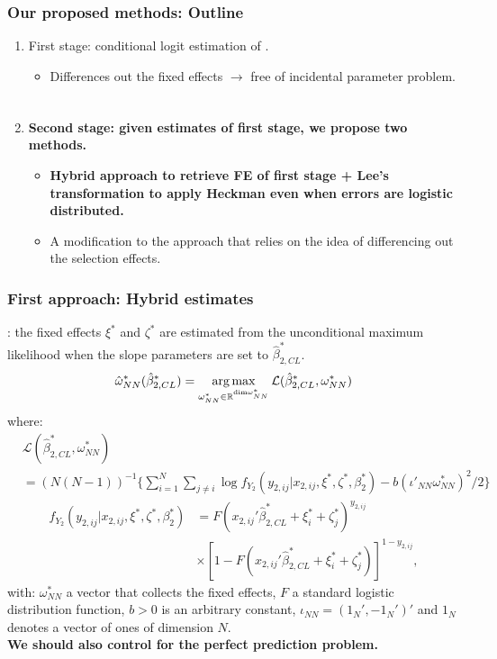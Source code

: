 \begin{frame}
    \frametitle{Our proposed methods: Outline}
    \begin{enumerate}
        \item First stage: conditional logit estimation of \cite{charbonneau2017multiple}.
        \begin{itemize}
            \item Differences out the fixed effects $\xrightarrow[]{}$ free of incidental parameter problem.\\~\\ 
        \end{itemize}
        \item \textbf{Second stage: given estimates of first stage, we propose two methods.}
        \begin{itemize}
            \item \textbf{Hybrid approach to retrieve FE of first stage + Lee's transformation to apply Heckman even when errors are logistic distributed.}
            \item A modification to the \cite{kyriazidou1997estimation} approach that relies on the idea of differencing out the selection effects.
        \end{itemize}
    \end{enumerate}
\end{frame}


\begin{frame}
    \frametitle{First approach: Hybrid estimates}
    \cite{martin2018bls}: the fixed effects $\xi^*$ and $\zeta^*$ are estimated from the unconditional maximum likelihood when the slope parameters are set to $\hat{\beta}_{2,CL}^*$.
        $$\hat{\omega}_{NN}^*(\hat{\beta}_{2,CL}^*) = \operatorname*{arg\max}_{\omega_{NN}^* \in \mathbb{R}^{\text{dim} \omega_{NN}^*}} \mathcal{L} (\hat{\beta}_{2,CL}^*, \omega_{NN}^*)  $$ 
      where:
      \begin{align*} 
        &\mathcal{L} (\hat{\beta}_{2,CL}^*, \omega_{NN}^*) \\ &= (N(N-1))^{-1} \Big\{ \sum_{i=1}^{N}\sum_{j\neq i} \log f_{Y_2} ( y_{2,ij} \rvert  x_{2,ij}, \xi^*, \zeta^*, \beta_2^*) - b(\iota'_{NN} \omega_{NN}^*)^2/2 \Big\} \nonumber
    \end{align*}
    \begin{align*}
        f_{Y_2} ( y_{2,ij} \rvert  x_{2,ij}, \xi^*, \zeta^*, \beta_2^*) &= F(x_{2,ij}'\hat{\beta}_{2,CL}^*  +\xi_{i}^*+\zeta_{j}^*)^{y_{2,ij}} \nonumber\\ 
        &\times [1 - F(x_{2,ij}'\hat{\beta}_{2,CL}^*  +\xi_{i}^*+\zeta_{j}^*)]^{1-y_{2,ij}}, 
     \end{align*}
     with: $\omega_{NN}^*$ a vector that collects the fixed effects, $F$ a standard logistic distribution function, $b>0$ is an arbitrary constant, $\iota_{NN} = (1_N', - 1_N')'$ and $1_N$ denotes a vector of ones of dimension $N$.\pause \\
\textbf{We should also control for the perfect prediction problem.}    
\end{frame}

